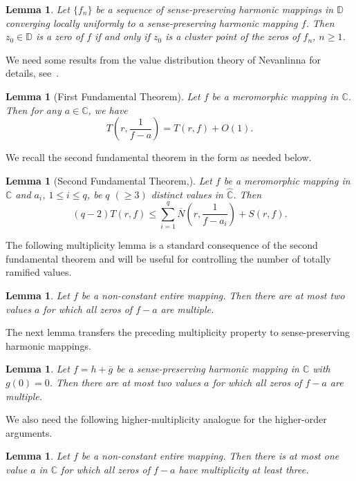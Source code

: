 \documentclass[11pt, reqno]{amsart}
\numberwithin{equation}{section}
\theoremstyle{definition}
\theoremstyle{remark}
\theoremstyle{plain}
\newtheorem{lemma}[definition]{Lemma}
\begin{document}
\begin{lemma}\label{hurwitz}\cite[Para.3, p. 10 ]{Duren}
Let $\{f_n\}$ be a sequence of sense-preserving harmonic mappings in
$\mathbb{D}$ converging locally uniformly to a sense-preserving harmonic
mapping $f$. Then $z_0\in\mathbb{D}$ is a zero of $f$ if and only if
$z_0$ is a cluster point of the zeros of $f_n$, $n\geq 1$.
\end{lemma}

We need some results from the value distribution theory of 
Nevanlinna for details, see~\cite{Lo2013}.
\begin{lemma}[First Fundamental Theorem]
Let $f$ be a meromorphic mapping in $\mathbb{C}$. Then for any
$a\in\mathbb{C}$, we have
\[
T\!\left(r,\frac{1}{f-a}\right)
=
T(r,f)+O(1).
\]
\end{lemma}

We recall the second fundamental theorem in the form as needed below.
\begin{lemma}[Second Fundamental Theorem,\label{SecFunThe}]
Let $f$ be a meromorphic mapping in $\mathbb{C}$ and
$a_i$, $1\leq i\leq q$, be $q$ $(\geq 3)$ distinct values in
$\mathbb{\hat C}$. Then
\[
(q-2)T(r,f)
\leq
\sum_{i=1}^{q}
\overline{N}\!\left(r,\frac{1}{f-a_i}\right)
+S(r,f).
\]
\end{lemma}

The following multiplicity lemma is a standard consequence of the
second fundamental theorem and will be useful for
controlling the number of totally ramified values. 

\begin{lemma}\cite[Lemma 2.6]{charakbharti}
Let $f$ be a non-constant entire mapping. Then there are at most two
values $a$ for which all zeros of $f-a$ are multiple.
\end{lemma}

The next lemma transfers the preceding multiplicity property to
sense-preserving harmonic mappings.

\begin{lemma}\label{threevaluelemma}\cite[Lemma 2.7]{charakbharti}
Let $f=h+\overline{g}$ be a sense-preserving harmonic mapping in
$\mathbb{C}$ with $g(0)=0$. Then there are at most two values $a$
for which all zeros of $f-a$ are multiple.
\end{lemma}

We also need the following higher-multiplicity analogue for the 
higher-order arguments.
\begin{lemma}\label{twovaluelemma}
  Let $f$ be a non-constant entire mapping. Then there is at most 
  one value $a$ in $\mathbb{C}$ for which all zeros of $f-a$ have 
  multiplicity at least three.
\end{lemma}
\end{document}
